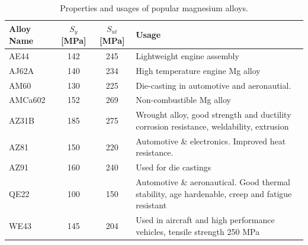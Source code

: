 \documentclass[
10pt,
a4paper,
openany,
svgnames,
]{book}
\begin{document}
\begin{table}[H]
  \centering
  \caption{Properties and usages of popular magnesium alloys. \cite{avedesian1999asm}}
  \label{tab: mag alloy props and uses}
  {\renewcommand{\arraystretch}{1.4}
  \begin{tabular}{lccL{7cm}}
    \toprule
    Alloy Name & $S_y$ [MPa] & $S_{ut}$ [MPa] &  Usage \\
    \midrule
    AE44       & 142 & 245    & Lightweight engine assembly \\
    AJ62A      & 140 & 234    & High temperature engine Mg alloy                                                             \\
    AM60       & 130 & 225    & Die-casting in automotive and aeronautial.                                                                                            \\
    AMCa602    & 152 & 269    & Non-combustible Mg alloy                                                                     \\
    AZ31B      & 185 & 275    & Wrought alloy, good strength and ductility corrosion resistance, weldability, extrusion      \\
    AZ81       & 150 & 220    & Automotive \& electronics. Improved heat resistance.                                          \\
    AZ91    & 160 & 240 & Used for die castings                                                                        \\
    QE22    & 100 & 150  & Automotive \& aeronautical. Good thermal stability, age hardenable, creep and fatigue resistant \\
    WE43    & 145  & 204 & Used in aircraft and high performance vehicles, tensile strength 250 MPa              \\
    \bottomrule                     
  \end{tabular}}
\end{table}
\end{document}
